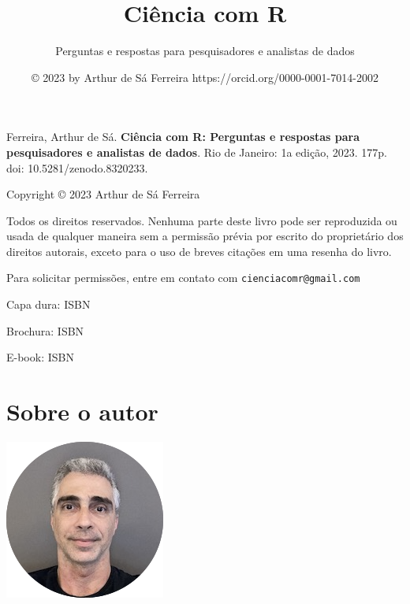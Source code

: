 \documentclass[
  a4paper,
]{book}
\title{\textbf{Ciência com R}}
\subtitle{Perguntas e respostas para pesquisadores e analistas de dados}
\author{© 2023 by Arthur de Sá Ferreira https://orcid.org/0000-0001-7014-2002}
\date{}
\renewcommand{\href}[2]{#2\footnote{\url{#1}}}
\newcommand{\DisableFootNotes}{%
  \renewcommand{\footnote}[2][]{\relax}
}
\begin{document}
\maketitle


\newpage


\newpage

{
\setcounter{tocdepth}{1}
\tableofcontents
}
\listoffigures
\listoftables
\DisableFootNotes

\clearpage
\markboth{}{}

Ferreira, Arthur de Sá. \textbf{Ciência com R: Perguntas e respostas para pesquisadores e analistas de dados}. Rio de Janeiro: 1a edição, 2023. 177p. \href{https://doi.org/10.5281/zenodo.8320233}{doi: 10.5281/zenodo.8320233}.

\vspace*{\fill}

Copyright © 2023 Arthur de Sá Ferreira

Todos os direitos reservados. Nenhuma parte deste livro pode ser reproduzida ou usada de qualquer maneira sem a permissão prévia por escrito do proprietário dos direitos autorais, exceto para o uso de breves citações em uma resenha do livro.

Para solicitar permissões, entre em contato com \href{mailto:cienciacomr@gmail.com}{\nolinkurl{cienciacomr@gmail.com}}

Capa dura: ISBN

Brochura: ISBN

E-book: ISBN

\hypertarget{sobre-o-autor}{%
\chapter*{Sobre o autor}\label{sobre-o-autor}}

\markboth{}{}

\includegraphics{images/ASF.png}
\end{document}
